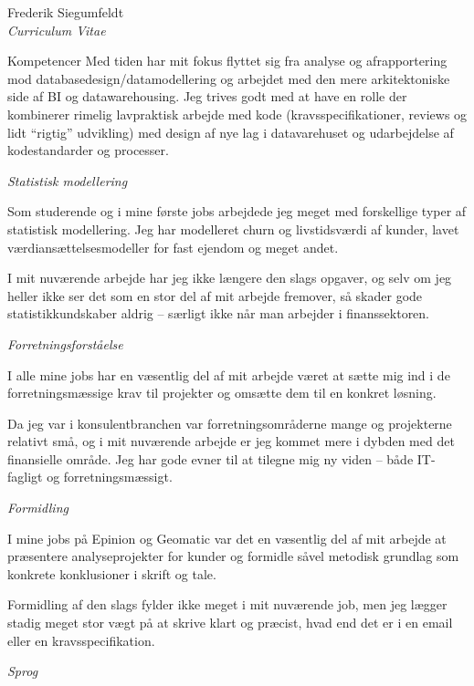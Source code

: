 \documentclass[a4paper]{article}
\begin{document}
\begin{cv}{Frederik Siegumfeldt\\{\large \itshape Curriculum Vitae}}
\begin{cvlist}{Kompetencer}
    Med tiden har mit fokus flyttet sig fra analyse og afrapportering 
    mod databasedesign/datamodellering og arbejdet med den mere 
    arkitektoniske side af BI og datawarehousing. Jeg trives godt med
    at have en rolle der kombinerer rimelig lavpraktisk arbejde med kode
    (kravsspecifikationer, reviews og lidt ``rigtig'' udvikling) med 
    design af nye lag i datavarehuset og udarbejdelse af kodestandarder 
    og processer.

  \item[\emph{Statistisk modellering}]

    Som studerende og i mine første jobs arbejdede jeg meget med 
    forskellige typer af statistisk modellering. Jeg har modelleret churn 
    og livstidsværdi af kunder, lavet værdiansættelsesmodeller for 
    fast ejendom og meget andet.

    I mit nuværende arbejde har jeg ikke længere den slags opgaver,
    og selv om jeg heller ikke ser det som en stor del af mit arbejde 
    fremover, så skader gode statistikkundskaber aldrig -- særligt 
    ikke når man arbejder i finanssektoren.

  \item[\emph{Forretningsforståelse}]

    I alle mine jobs har en væsentlig del af mit arbejde været at 
    sætte mig ind i de forretningsmæssige krav til projekter og omsætte 
    dem til en konkret løsning.

    Da jeg var i konsulentbranchen var forretningsområderne mange og 
    projekterne relativt små, og i mit nuværende arbejde er jeg kommet 
    mere i dybden med det finansielle område. Jeg har gode evner til 
    at tilegne mig ny viden -- både IT-fagligt og forretningsmæssigt.

  \item[\emph{Formidling}] 

    I mine jobs på Epinion og Geomatic var det en væsentlig del af 
    mit arbejde at præsentere analyseprojekter for kunder og formidle såvel 
    metodisk grundlag som konkrete konklusioner i skrift og tale.

    Formidling af den slags fylder ikke meget i mit nuværende job, men
    jeg lægger stadig meget stor vægt på at skrive klart og præcist, hvad end
    det er i en email eller en kravsspecifikation.

  \item[\emph{Sprog}]


\end{cvlist}
\end{cv}
\end{document}
